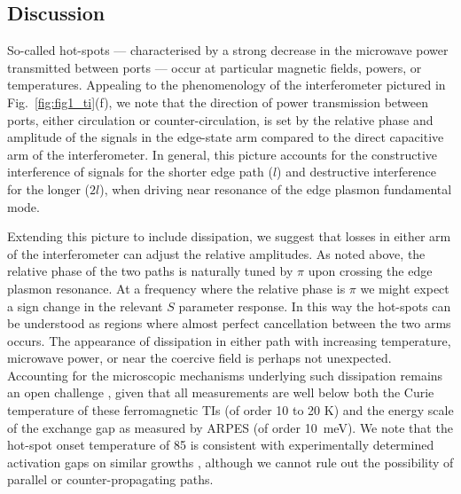 \subsection{Discussion}
So-called hot-spots --- characterised by a strong decrease in the microwave power transmitted between ports --- occur at particular magnetic fields, powers, or temperatures. Appealing to the phenomenology of the interferometer pictured in Fig.~\ref{fig:fig1_ti}(f), we note that the direction of power transmission between ports, either circulation or counter-circulation, is set by the relative phase and amplitude of the signals in the edge-state arm compared to the direct capacitive arm of the interferometer. In general, this picture accounts for the constructive interference of signals for the shorter edge path ($l$) and destructive interference for the longer ($2l$), when driving near resonance of the edge plasmon fundamental mode.

Extending this picture to include dissipation, we suggest that losses in either arm of the interferometer can adjust the relative amplitudes. As noted above, the relative phase of the two paths is naturally tuned by $\pi$ upon crossing the edge plasmon resonance. At a frequency where the relative phase is $\pi$ we might expect a sign change in the relevant $S$ parameter response. In this way the hot-spots can be understood as regions where almost perfect cancellation between the two arms occurs. The appearance of dissipation in either path with increasing temperature, microwave power, or near the coercive field is perhaps not unexpected. Accounting for the microscopic mechanisms underlying such dissipation remains an open challenge \cite{PhysRevLett.115.057206, wang2013anomalous, bestwick2015precise,wang2014universal, kou2015metal, feng2015observation, li2016origin}, given that all measurements are well below both the Curie temperature of these ferromagnetic TIs (of order 10 to 20 K) and the energy scale of the exchange gap as measured by ARPES (of order \SI{10}{\milli\electronvolt}).  We note that the hot-spot onset temperature of \SI{85}{\mk} is consistent with experimentally determined activation gaps on similar growths \cite{bestwick2015precise}, although we cannot rule out the possibility of parallel or counter-propagating paths.

